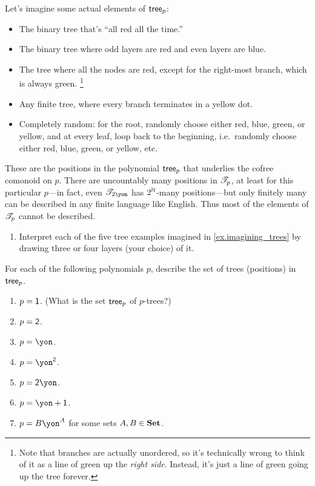 \documentclass[Book-Poly]{subfiles}
\begin{document}
\begin{example}
Let's imagine some actual elements of $\mathsf{tree}_p$:
\begin{itemize}
	\item The binary tree that's ``all red all the time.''
	\item The binary tree where odd layers are red and even layers are blue.
	\item The tree where all the nodes are red, except for the right-most branch, which is always green.%
	\footnote{\;Note that branches are actually unordered, so it's technically wrong to think of it as a line of green up the \emph{right side}. Instead, it's just a line of green going up the tree forever.}
	\item Any finite tree, where every branch terminates in a yellow dot.
	\item Completely random: for the root, randomly choose either red, blue, green, or yellow, and at every leaf, loop back to the beginning, i.e.\ randomly choose either red, blue, green, or yellow, etc.
\end{itemize}
These are the positions in the polynomial $\mathsf{tree}_p$ that underlies the cofree comonoid on $p$. There are uncountably many positions in $\mathscr{T}_{p}$, at least for this particular $p$---in fact, even $\cofree{2\yon}$ has $2^{\mathbb{N}}$-many positions---but only finitely many can be described in any finite language like English. Thus most of the elements of $\mathscr{T}_{p}$ cannot be described.
\end{example}

\begin{exercise}\label{exc.trees_1}
\begin{enumerate}
	\item Interpret each of the five tree examples imagined in \cref{ex.imagining_trees} by drawing three or four layers (your choice) of it.
\end{enumerate}
For each of the following polynomials $p$, describe the set of trees (positions) in $\mathsf{tree}_{p}$.
\begin{enumerate}[resume]
	\item $p=\textsf{1}$. (What is the set $\mathsf{tree}_p$ of $p$-trees?)
	\item $p=\textsf{2}$.
	\item $p=\yon$.
	\item $p=\yon^\2$.
	\item $p={\2\yon}$.
	\item $p={\yon+\1}$.
	\item $p={B\yon^A}$ for some sets $A,B\in\mathbf{Set}$.
\qedhere
\end{enumerate}
\end{exercise}
\end{document}
